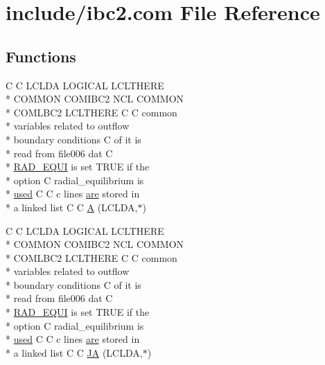 \hypertarget{home_2abonfi_2_c_f_d__codes_2_eul_f_s_83_84_2include_2ibc2_8com}{\section{include/ibc2.com File Reference}
\label{home_2abonfi_2_c_f_d__codes_2_eul_f_s_83_84_2include_2ibc2_8com}
}
\subsection*{Functions}
\begin{DoxyCompactItemize}
\item 
C C L\-C\-L\-D\-A L\-O\-G\-I\-C\-A\-L L\-C\-L\-T\-H\-E\-R\-E \\*
C\-O\-M\-M\-O\-N C\-O\-M\-I\-B\-C2 N\-C\-L C\-O\-M\-M\-O\-N \\*
C\-O\-M\-L\-B\-C2 L\-C\-L\-T\-H\-E\-R\-E C C common \\*
variables related to outflow \\*
boundary conditions C of it is \\*
read from file006 dat C \\*
\hyperlink{msa20_2home_2abonfi_2_c_f_d__codes_2_eul_f_s_83_82_83_2include_2ibc2_8com_a5e52771773c3d7155ccec9942c9d7d87}{R\-A\-D\-\_\-\-E\-Q\-U\-I} is set T\-R\-U\-E if the \\*
option C radial\-\_\-equilibrium is \\*
\hyperlink{msa20_2home_2abonfi_2_c_f_d__codes_2_eul_f_s_83_82_83_2include_2stream_8com_a3291a21585d0aec360cd82d75bf51496}{used} C C c lines \hyperlink{msa20_2home_2abonfi_2_c_f_d__codes_2_eul_f_s_83_82_83_2include_2ibc8_8com_a7f7721a0bb3c1d35cfbfbcfd6efc1548}{are} stored in \\*
a linked list C C \hyperlink{home_2abonfi_2_c_f_d__codes_2_eul_f_s_83_84_2include_2ibc2_8com_ad2108d58343608772fff791c23da58f5}{A} (L\-C\-L\-D\-A,$\ast$)
\item 
C C L\-C\-L\-D\-A L\-O\-G\-I\-C\-A\-L L\-C\-L\-T\-H\-E\-R\-E \\*
C\-O\-M\-M\-O\-N C\-O\-M\-I\-B\-C2 N\-C\-L C\-O\-M\-M\-O\-N \\*
C\-O\-M\-L\-B\-C2 L\-C\-L\-T\-H\-E\-R\-E C C common \\*
variables related to outflow \\*
boundary conditions C of it is \\*
read from file006 dat C \\*
\hyperlink{msa20_2home_2abonfi_2_c_f_d__codes_2_eul_f_s_83_82_83_2include_2ibc2_8com_a5e52771773c3d7155ccec9942c9d7d87}{R\-A\-D\-\_\-\-E\-Q\-U\-I} is set T\-R\-U\-E if the \\*
option C radial\-\_\-equilibrium is \\*
\hyperlink{msa20_2home_2abonfi_2_c_f_d__codes_2_eul_f_s_83_82_83_2include_2stream_8com_a3291a21585d0aec360cd82d75bf51496}{used} C C c lines \hyperlink{msa20_2home_2abonfi_2_c_f_d__codes_2_eul_f_s_83_82_83_2include_2ibc8_8com_a7f7721a0bb3c1d35cfbfbcfd6efc1548}{are} stored in \\*
a linked list C C \hyperlink{home_2abonfi_2_c_f_d__codes_2_eul_f_s_83_84_2include_2ibc2_8com_af199d7d60a8f42163bb27e1d8108fedb}{J\-A} (L\-C\-L\-D\-A,$\ast$)
\end{DoxyCompactItemize}
